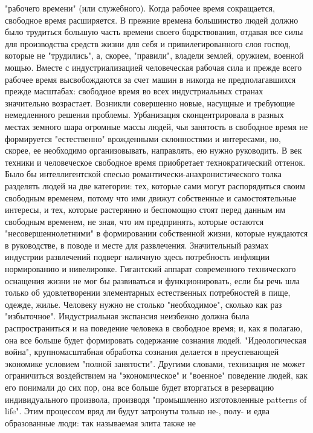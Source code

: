 \documentclass[12pt]{article}
\begin{document}
"рабочего времени" (или служебного). Когда рабочее время сокращается, свободное время расширяется. В
прежние времена большинство людей должно было трудиться большую часть времени своего бодрствования,
отдавая все силы для производства средств жизни для себя и
привилегированного  слоя  господ,  которые  не  "трудились",  а,  скорее,  "правили",  владели  землей,  оружием,
военной мощью. Вместе с
индустриализацией человеческая рабочая сила и прежде всего рабочее время высвобождаются за счет машин в
никогда  не  предполагавшихся  прежде  масштабах:  свободное  время  во  всех  индустриальных  странах
значительно  возрастает.  Возникли  совершенно  новые,  насущные  и  требующие  немедленного  решения
проблемы. Урбанизация сконцентрировала в разных местах земного шара огромные массы людей, чья занятость
в свободное время не формируется "естественно" врожденными склонностями и интересами, но, скорее, ее
необходимо организовывать, направлять, ею нужно руководить. В век техники и человеческое свободное время
приобретает технократический оттенок. Было бы интеллигентской спесью романтически-анахронистического
толка разделять людей на две категории: тех, которые сами могут распорядиться своим свободным временем,
потому что ими движут собственные и самостоятельные интересы, и тех, которые растерянно и беспомощно
стоят перед данным им свободным временем, не зная, что им предпринять, которые остаются
"несовершеннолетними" в формировании собственной жизни, которые нуждаются в руководстве, в поводе и
месте для развлечения. Значительный размах индустрии развлечений подверг наличную здесь потребность
инфляции нормированию и нивелировке. Гигантский аппарат современного технического оснащения жизни не
мог  бы  развиваться  и  функционировать,  если  бы  речь  шла  только  об  удовлетворении  элементарных
естественных потребностей в пище, одежде, жилье. Человеку нужно не столько "необходимое", сколько как раз
"избыточное". Индустриальная экспансия неизбежно должна была распространиться и на поведение человека в
свободное время; и, как я полагаю, она все больше будет формировать содержание сознания людей.
"Идеологическая  война",  крупномасштабная  обработка  сознания  делается  в  преуспевающей  экономике
условием  "полной  занятости".  Другими  словами,  технизация  не  может  ограничиться  воздействием  на
"экономическое" и "военное" поведение людей, как его понимали до сих пор, она все больше будет вторгаться в
резервацию  индивидуального  произвола,  производя  "промышленно  изготовленные  patterns  of  life".  Этим
процессом вряд ли будут затронуты только не-, полу- и едва образованные люди: так называемая элита также не
\end{document}
